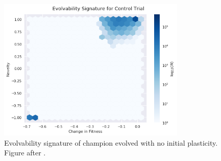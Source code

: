\begin{figure}
    \centering
    \includegraphics[width=0.8\textwidth]{img/es_p0}
 	\captionsetup{singlelinecheck=off,justification=raggedright}
  	\caption{Evolvability signature of champion evolved with no initial plasticity. Figure after \cite{Tarapore2015EvolvabilityBenchmarks}.}
    \label{fig:es_p0}
\end{figure}